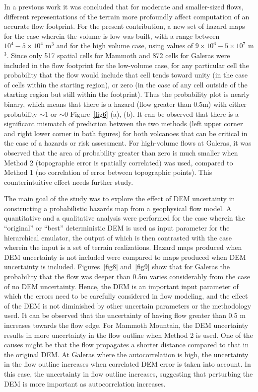 \documentclass[12pt]{article}
\begin{document}
In a previous work \citep{stefanescu1} it was concluded that for moderate and
smaller-sized flows, different representations of the terrain more
profoundly affect computation of an accurate flow footprint.  For the
present contribution, a new set of hazard maps for the
case wherein the volume is low was built, with a range between $10^4 - 5\times
10^4$ m$^3$ and for the high volume case, using values of $9\times 10^6 - 5\times
10^7$ m$^3$.  Since only 517 spatial cells for Mammoth and 872 cells
for Galeras were included in the flow footprint for the low-volume
case, for any particular cell the probability that the flow would
include that cell tends toward unity (in the case of cells within the
starting region), or zero (in the case of any cell outside of the
starting region but still within the footprint).  Thus the probability
plot is nearly binary, which means that there is a hazard (flow
greater than 0.5m) with either probability $\sim1$ or $\sim0$
Figure~\ref{fig6} (a), (b). It can be observed that there is a significant
mismatch of prediction between the two methods (left upper corner and
right lower corner in both figures) for both volcanoes that can be
critical in the case of a hazards or risk assessment.  For high-volume
flows at Galeras, it was observed that the area of probability greater than
zero is much smaller when Method 2 (topographic error is spatially 
correlated) was used, compared to Method 1 (no correlation of error between
topographic points). This counterintuitive effect needs further study.

The main goal of the study was to explore the effect of DEM uncertainty in
constructing a probabilistic hazards map from a geophysical flow model.  A quantitative and a qualitative analysis
were performed for the case wherein the ``original'' or ``best''
deterministic DEM \citep{stefanescu2} is used as input parameter for the hierarchical
emulator, the output of which is then contrasted with the case wherein
the input is a set of terrain realizations.
Hazard maps produced when DEM uncertainty is not
included were compared to maps produced when DEM uncertainty is included.
Figures~\ref{fig8} and~\ref{fig9} show that for Galeras the
probability that the flow was deeper than 0.5m varies considerably
from the case of no DEM uncertainty. Hence, the DEM is an important
input parameter of which the errors need to be carefully considered in
flow modeling, and the effect of the DEM is not diminished by other
uncertain parameters or the methodology used.  It can be observed that the
uncertainty of having flow greater than 0.5 m increases towards the
flow edge. For Mammoth Mountain, the DEM uncertainty results in more
uncertainty in the flow outline when Method 2 is used. One of the
causes might be that the flow propagates a shorter distance compared
to that in the original DEM.
At Galeras where the autocorrelation is high,  the uncertainty in the 
flow outline increases when correlated DEM error is taken into account. 
In this case, the uncertainty in flow outline increases, suggesting that 
perturbing the DEM is more important as autocorrelation increases.
\end{document}
